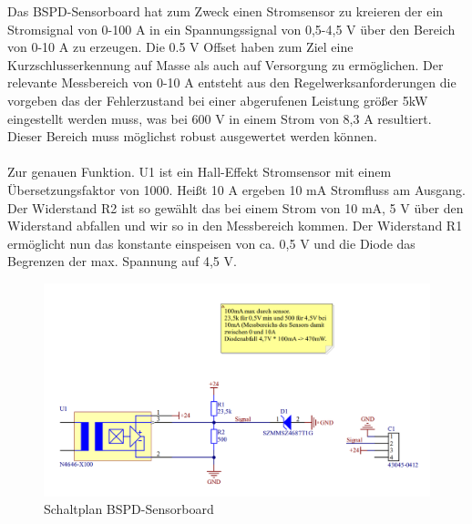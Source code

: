 Das  \ac{BSPD}-Sensorboard hat zum Zweck einen Stromsensor zu kreieren der ein Stromsignal von 0-100 A in ein Spannungssignal von 0,5-4,5 V über den Bereich von 0-10 A zu erzeugen. Die 0.5 V Offset haben zum Ziel eine Kurzschlusserkennung auf Masse als auch auf Versorgung zu ermöglichen. Der relevante Messbereich von 0-10 A entsteht aus den Regelwerksanforderungen die vorgeben das der Fehlerzustand bei einer abgerufenen Leistung größer 5kW eingestellt werden muss, was bei 600 V in einem Strom von 8,3 A resultiert. Dieser Bereich muss möglichst robust ausgewertet werden können.
\\
\\
Zur genauen Funktion. U1 ist ein Hall-Effekt Stromsensor mit einem Übersetzungsfaktor von 1000. Heißt 10 A ergeben 10 mA Stromfluss am Ausgang. Der Widerstand R2 ist so gewählt das bei einem Strom von 10 mA, 5 V über den Widerstand abfallen und wir so in den Messbereich kommen. Der Widerstand R1 ermöglicht nun das konstante einspeisen von ca. 0,5 V und die Diode das Begrenzen der max. Spannung auf 4,5 V.

\begin{figure}
	\centering
	\includegraphics[width=0.7\linewidth]{"bilder/Sensorboard Schaltung"}
	\caption{Schaltplan \ac{BSPD}-Sensorboard}
	\label{fig:sensorboard-schaltung}
\end{figure}

\FloatBarrier
